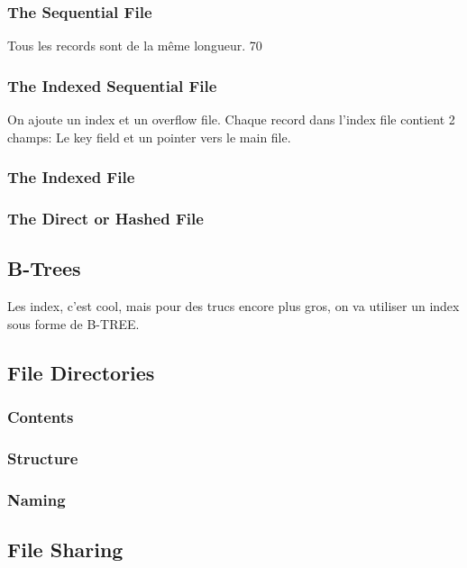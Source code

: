 \subsubsection{The Sequential File}
Tous les records sont de la même longueur. 70

\subsubsection{The Indexed Sequential File}
On ajoute un index et un overflow file. Chaque record dans l’index file contient 2 champs: Le key field et un pointer vers le main file.

\subsubsection{The Indexed File}

\subsubsection{The Direct or Hashed File}

\subsection{B-Trees}
Les index, c’est cool, mais pour des trucs encore plus gros, on va utiliser un index sous forme de B-TREE.

\subsection{File Directories}

\subsubsection{Contents}

\subsubsection{Structure}

\subsubsection{Naming}

\subsection{File Sharing}

